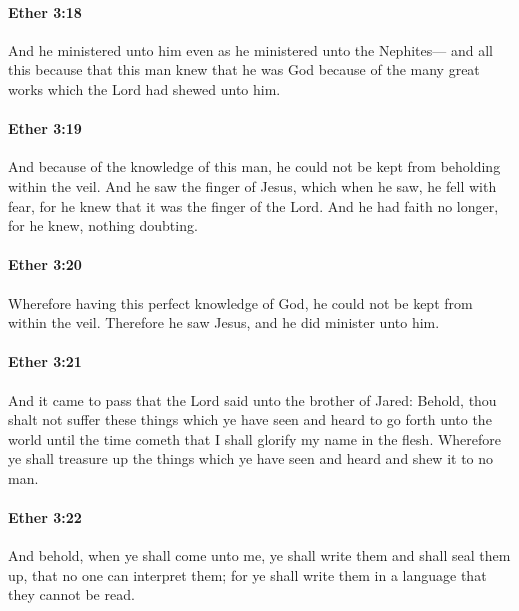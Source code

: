 		\paragraph{Ether 3:18} %
			\label{ETHER-3-18}

			And he ministered unto him
			even as he ministered unto the Nephites---
			and all this because that this man knew that he was God
			because of the many great works which the Lord had shewed unto him.

		\paragraph{Ether 3:19} %
			\label{ETHER-3-19}

			And because of the knowledge of this man,
			he could not be kept from beholding within the veil.
			And he saw the finger of Jesus,
			which when he saw, he fell with fear,
			for he knew that it was the finger of the Lord.
			And he had faith no longer,
			for he knew, nothing doubting.

		\paragraph{Ether 3:20} %
			\label{ETHER-3-20}

			Wherefore having this perfect knowledge of God,
			he could not be kept from within the veil.
			Therefore he saw Jesus, and he did minister unto him.

		\paragraph{Ether 3:21} %
			\label{ETHER-3-21}

			And it came to pass that the Lord said unto the brother of Jared:
			Behold, thou shalt not suffer these things which ye have seen and heard
			to go forth unto the world
			until the time cometh that I shall glorify my name in the flesh.
			Wherefore ye shall treasure up the things which ye have seen and heard
			and shew it to no man.

		\paragraph{Ether 3:22} %
			\label{ETHER-3-22}

			And behold, when ye shall come unto me,
			ye shall write them and shall seal them up,
			that no one can interpret them;
			for ye shall write them in a language that they cannot be read.

